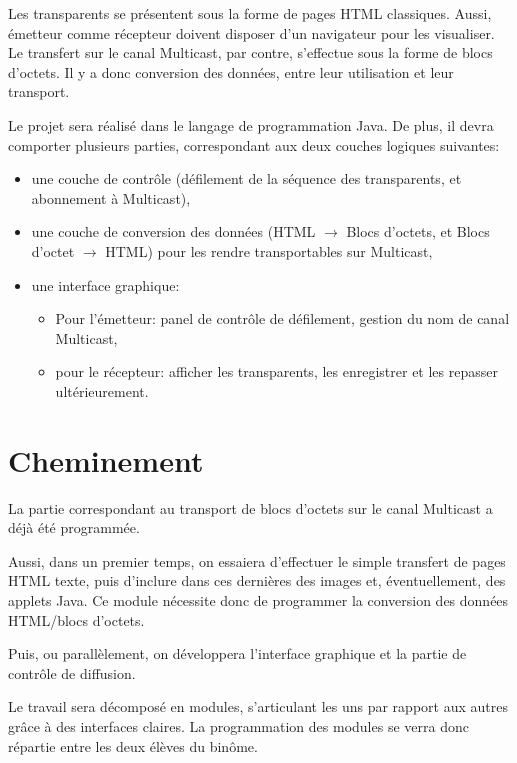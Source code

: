 \documentclass[12p]{article}
\begin{document}
Les transparents se pr\'esentent sous la forme de pages HTML
classiques. Aussi, \'emetteur comme r\'ecepteur doivent disposer d'un
navigateur pour les visualiser. Le transfert sur le canal Multicast, par
contre, s'effectue sous la forme de blocs d'octets. Il y a donc conversion
des donn\'ees, entre leur utilisation et leur transport.

Le projet sera r\'ealis\'e dans le langage de programmation Java. De plus,
il devra comporter plusieurs parties, correspondant aux deux couches
logiques suivantes:
\begin{itemize}
  \item une couche de contr\^ole (d\'efilement de la s\'equence des
    transparents, et abonnement \`a Multicast),
  \item une couche de conversion des donn\'ees (HTML $\rightarrow$ Blocs
    d'octets, et Blocs d'octet $\rightarrow$ HTML) pour les rendre
    transportables sur Multicast,
  \item une interface graphique:
    \begin{itemize}
      \item Pour l'\'emetteur: panel de contr\^ole de d\'efilement, gestion
        du nom de canal Multicast,
      \item pour le r\'ecepteur: afficher les transparents, les enregistrer
        et les repasser ult\'erieurement.
    \end{itemize}
\end{itemize}
  
\section{Cheminement}
La partie correspondant au transport de blocs d'octets sur le canal
Multicast a d\'ej\`a \'et\'e programm\'ee.

Aussi, dans un premier temps, on essaiera d'effectuer le simple transfert
de pages HTML texte, puis d'inclure dans ces derni\`eres des images et,
\'eventuellement, des applets Java. Ce module n\'ecessite donc de
programmer la conversion des donn\'ees HTML/blocs d'octets.

Puis, ou parall\`element, on d\'eveloppera l'interface graphique et la
partie de contr\^ole de diffusion.

Le travail sera d\'ecompos\'e en modules, s'articulant les uns par rapport
aux autres gr\^ace \`a des interfaces claires. La programmation des modules
se verra donc r\'epartie entre les deux \'el\`eves du bin\^ome.
\end{document}
